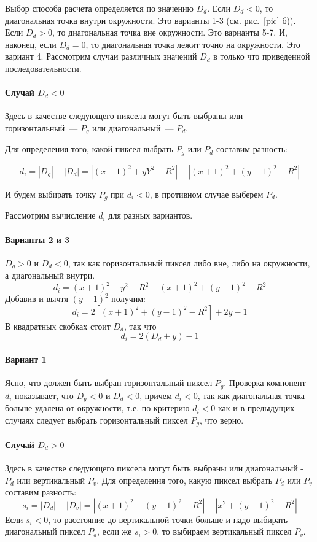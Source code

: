 Выбор способа расчета определяется по значению $D_d$. Если $D_d < 0$, то диагональная точка внутри окружности. Это варианты 1-3 (см. рис.~\ref{pic} б)). Если $D_d > 0$, то диагональная точка вне окружности. Это варианты 5-7. И, наконец, если $D_d = 0$, то диагональная точка лежит точно на окружности. Это вариант 4. Рассмотрим случаи различных значений $D_d$ в только что приведенной последовательности. 

\paragraph{Случай $D_d < 0$}
Здесь в качестве следующего пиксела могут быть выбраны или горизонтальный~--- $P_g$ или диагональный~--- $P_d$.

Для определения того, какой пиксел выбрать $P_g$ или $P_d$ составим разность:

$$d_i = |D_g| - |D_d| =|(x+1)^2 + yY^2 - R^2| - |(x+1)^2 + (y-1)^2 - R^2|$$
	
И будем выбирать точку $P_g$ при $d_i < 0$, в противном случае выберем $P_d$.

Рассмотрим вычисление $d_i$ для разных вариантов.

\paragraph{Варианты 2 и 3}
$D_g > 0$ и $D_d < 0$, так как горизонтальный пиксел либо вне, либо на окружности, а диагональный внутри.
$$d_i = (x+1)^2 + y^2 - R^2 + (x+1)^2 + (y-1)^2 - R^2$$
Добавив и вычтя $(y-1)^2$ получим:
$$
d_i = 2[(x+1)^2 + (y-1)^2 - R^2] + 2y - 1
$$
В квадратных скобках стоит $D_d$, так что
$$
d_i = 2(D_d + y) - 1
$$

\paragraph{Вариант 1}

Ясно, что должен быть выбран горизонтальный пиксел $P_g$. Проверка компонент $d_i$ показывает, что $D_g < 0$ и $D_d < 0$, причем $d_i < 0$, так как диагональная точка больше удалена от окружности, т.е. по критерию $d_i < 0$ как и в предыдущих случаях следует выбрать горизонтальный пиксел $P_g$, что верно. 


\paragraph{Случай $D_d > 0$}
Здесь в качестве следующего пиксела могут быть выбраны или диагональный - $P_d$ или вертикальный $P_v$.
Для определения того, какую пиксел выбрать $P_d$ или $P_v$ составим разность:
$$	
s_i=|D_d| - |D_v| =|(x+1)^2 + (y-1)^2 - R^2| - |x^2 + (y-1)^2 - R^2|
$$
Если $s_i < 0$, то расстояние до вертикальной точки больше и надо выбирать диагональный пиксел $P_d$, если же $s_i > 0$, то выбираем вертикальный пиксел $P_v$.


